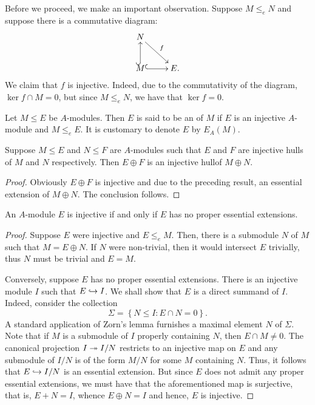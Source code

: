 \begin{remark}
    Before we proceed, we make an important observation. Suppose $M\le_e N$ and suppose there is a commutative diagram: 
    \begin{equation*}
        \xymatrix {
            N\ar[rd]^f\\
            M\ar@{^(->}[u]\ar@{^(->}[r] & E.
        }
    \end{equation*}
    We claim that $f$ is injective. Indeed, due to the commutativity of the diagram, $\ker f\cap M = 0$, but since $M\le_e N$, we have that $\ker f = 0$.
\end{remark}

\begin{definition}
    Let $M\le E$ be $A$-modules. Then $E$ is said to be an  of $M$ if $E$ is an injective $A$-module and $M\le_e E$. It is customary to denote $E$ by $E_A(M)$.
\end{definition}

\begin{proposition}
    Suppose $M\le E$ and $N\le F$ are $A$-modules such that $E$ and $F$ are injective hulls of $M$ and $N$ respectively. Then $E\oplus F$ is an injective hullof $M\oplus N$.
\end{proposition}
\begin{proof}
    Obviously $E\oplus F$ is injective and due to the preceding result, an essential extension of $M\oplus N$. The conclusion follows.
\end{proof}

\begin{proposition}
    An $A$-module $E$ is injective if and only if $E$ has no proper essential extensions.
\end{proposition}
\begin{proof}
    Suppose $E$ were injective and $E\le_e M$. Then, there is a submodule $N$ of $M$ such that $M = E\oplus N$. If $N$ were non-trivial, then it would intersect $E$ trivially, thus $N$ must be trivial and $E = M$.

    Conversely, suppose $E$ has no proper essential extensions. There is an injective module $I$ such that $E\hookrightarrow I$. We shall show that $E$ is a direct summand of $I$. Indeed, consider the collection 
    \begin{equation*}
        \Sigma = \left\{N\le I\colon E\cap N = 0\right\}.
    \end{equation*}
    A standard application of Zorn's lemma furnishes a maximal element $N$ of $\Sigma$. Note that if $M$ is a submodule of $I$ properly containing $N$, then $E\cap M\ne 0$. The canonical projection $I\twoheadrightarrow I/N$ restricts to an injective map on $E$ and any submodule of $I/N$ is of the form $M/N$ for some $M$ containing $N$. Thus, it follows that $E\hookrightarrow I/N$ is an essential extension. But since $E$ does not admit any proper essential extensions, we must have that the aforementioned map is surjective, that is, $E + N = I$, whence $E\oplus N = I$ and hence, $E$ is injective.
\end{proof}

